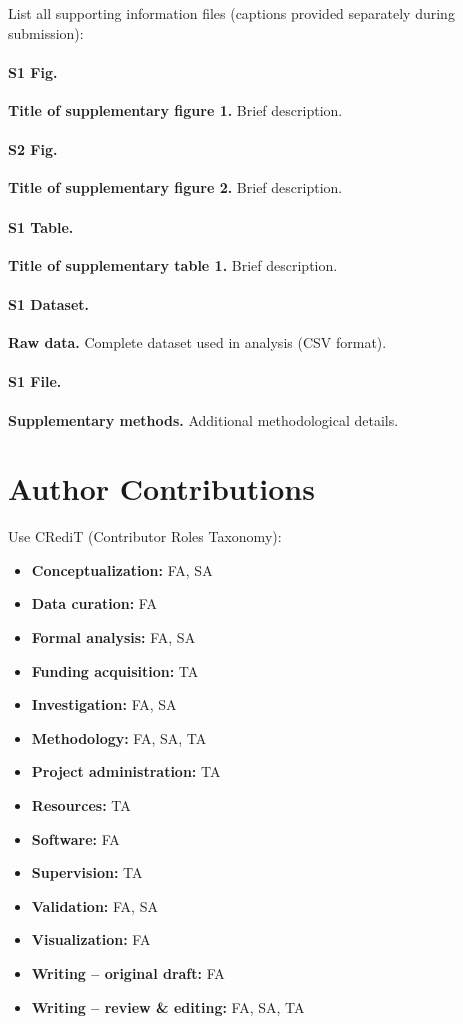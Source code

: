 \documentclass[10pt,letterpaper]{article}
\begin{document}
List all supporting information files (captions provided separately during submission):

\paragraph{S1 Fig.}
\textbf{Title of supplementary figure 1.} Brief description.

\paragraph{S2 Fig.}
\textbf{Title of supplementary figure 2.} Brief description.

\paragraph{S1 Table.}
\textbf{Title of supplementary table 1.} Brief description.

\paragraph{S1 Dataset.}
\textbf{Raw data.} Complete dataset used in analysis (CSV format).

\paragraph{S1 File.}
\textbf{Supplementary methods.} Additional methodological details.

\section*{Author Contributions}

Use CRediT (Contributor Roles Taxonomy):
\begin{itemize}
    \item \textbf{Conceptualization:} FA, SA
    \item \textbf{Data curation:} FA
    \item \textbf{Formal analysis:} FA, SA
    \item \textbf{Funding acquisition:} TA
    \item \textbf{Investigation:} FA, SA
    \item \textbf{Methodology:} FA, SA, TA
    \item \textbf{Project administration:} TA
    \item \textbf{Resources:} TA
    \item \textbf{Software:} FA
    \item \textbf{Supervision:} TA
    \item \textbf{Validation:} FA, SA
    \item \textbf{Visualization:} FA
    \item \textbf{Writing – original draft:} FA
    \item \textbf{Writing – review \& editing:} FA, SA, TA
\end{itemize}
\end{document}
